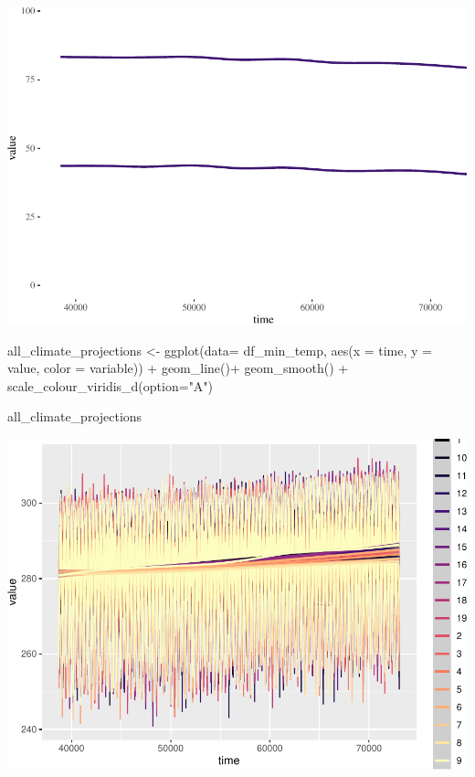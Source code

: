 \documentclass[
  paper=a4,
  ,captions=tableheading
]{scrartcl}
\newenvironment{Shaded}{\begin{snugshade}}{\end{snugshade}}
\newcommand{\AttributeTok}[1]{\textcolor[rgb]{0.77,0.63,0.00}{#1}}
\newcommand{\FunctionTok}[1]{\textcolor[rgb]{0.00,0.00,0.00}{#1}}
\newcommand{\NormalTok}[1]{#1}
\newcommand{\OtherTok}[1]{\textcolor[rgb]{0.56,0.35,0.01}{#1}}
\newcommand{\SpecialCharTok}[1]{\textcolor[rgb]{0.00,0.00,0.00}{#1}}
\newcommand{\StringTok}[1]{\textcolor[rgb]{0.31,0.60,0.02}{#1}}
\begin{document}
\includegraphics{Haskell_files/figure-latex/unnamed-chunk-43-1.pdf}

\begin{Shaded}
\begin{Highlighting}[]
\NormalTok{all\_climate\_projections }\OtherTok{\textless{}{-}} \FunctionTok{ggplot}\NormalTok{(}\AttributeTok{data=}\NormalTok{ df\_min\_temp, }\FunctionTok{aes}\NormalTok{(}\AttributeTok{x =}\NormalTok{ time, }\AttributeTok{y =}\NormalTok{ value, }\AttributeTok{color =}\NormalTok{ variable)) }\SpecialCharTok{+} 
  \FunctionTok{geom\_line}\NormalTok{()}\SpecialCharTok{+}
  \FunctionTok{geom\_smooth}\NormalTok{() }\SpecialCharTok{+}
  \FunctionTok{scale\_colour\_viridis\_d}\NormalTok{(}\AttributeTok{option=}\StringTok{"A"}\NormalTok{)}
  

\NormalTok{all\_climate\_projections}
\end{Highlighting}
\end{Shaded}

\includegraphics{Haskell_files/figure-latex/unnamed-chunk-44-1.pdf}
\end{document}
